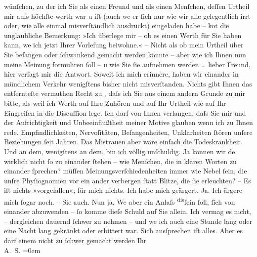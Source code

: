 \begin{ledgroupsized}[t]{13cm}
               wünſchen, zu der ich Sie als einen Freund und als einen Menſchen, deſſen Urtheil mir
               aufs höchſte werth war u iſt (auch we{\geminationn} er ſich nur wie
               wir alle {\pb}gelegentlich irrt oder,
               wie alle einmal misverſtändlich ausdrückt) eingeladen habe – ko{\geminationm}t die unglaubliche Bemerkung: »Ich überlege mir – ob es
               einen Werth für Sie haben kann, we{\geminationn} ich jetzt Ihrer
               Vorleſung beiwohne.« – Nicht als ob mein Urtheil über Sie befangen oder ſchwankend
               gemacht werden könnte – aber wie ich Ihnen nun meine {\pb}Meinung formuliren ſoll – u wie Sie ſie aufnehmen werden {\dots} lieber Freund, hier verſagt mir die Antwort. Soweit ich mich erinnere, haben wir
               einander in mündlichem Verkehr wenigſtens bisher nicht misverſtanden.  Nichts gibt Ihnen das entfernteſte
                  vermuthen Recht zu , daſs ich
               Sie aus einem andern {\pb}Grunde zu mir
               bitte, als weil ich Werth auf Ihre Zuhören und auf Ihr Urtheil wie auf Ihr Eingreifen
               in die Discuſſion lege. Ich darf von Ihnen verlangen, daſs Sie mir und der
               Aufrichtigkeit und Unbeeinflußtheit meiner Motive glauben wenn ich zu
               Ihnen rede. Empfindlichkeiten, Nervoſitäten, Befan{\pb}genheiten, Unklarheiten ſtören
               unſere Beziehungen ſeit Jahren. Das Mistrauen aber wäre einfach die Todeskrankheit.
               Und an dem, wenigſtens an dem, bin \uline{ich} völlig
               unſchuldig. Ja können wir de{\geminationn} wirklich nicht ſo zu
               einander ſtehen – wie Menſchen, die in klaren Worten zu einander ſprechen? {\pb}müſſen Meinungsverſchiedenheiten
               immer wie Nebel ſein, die unſre Phyſiognomien vor ein ander verbergen ſtatt Blitze,
               die ſie erleuchten? – Es iſt nichts »vorgefallen«; für mich nichts. Ich habe mich
               geärgert. Ja. Ich ärgere mich ſogar noch. – Sie auch. Nun ja. We{\geminationn} aber ein Anlaſs \substVorne{}\textsuperscript{dſs}\substDazwischen{}ſein ſoll\substHinten{}, ſich von einander abzu{\pb}wenden – ſo komme dieſe Schuld auf
               Sie allein. Ich vermag es nicht, – dergleichen \introOben{}dauernd\introOben{}\strikeout{\textcolor{gray}{X}} ſchwer zu nehmen – und we{\geminationn} ich auch \strikeout{\textcolor{gray}{XXXXXX}}\strikeout{\textcolor{gray}{X}} eine Stunde lang oder eine Nacht lang gekränkt oder erbittert war. Sich
               ausſprechen iſt alles. Aber es darf einem nicht {\pb}zu ſchwer gemacht werden \pend
           \pstart
           Ihr {\\[\baselineskip]}\spacefill\mbox{A. S.}\pend
           \leftskip=0em{}
         
         \endnumbering{}\end{ledgroupsized}\begin{anhang}\end{anhang}\newcommand{\dateiname}{L02989}\newcommand{\titel}{Arthur Schnitzler an Felix Salten, 10. 11. 1903}\newcommand{\editorInnen}{Martin Anton Müller und Laura Untner}
      